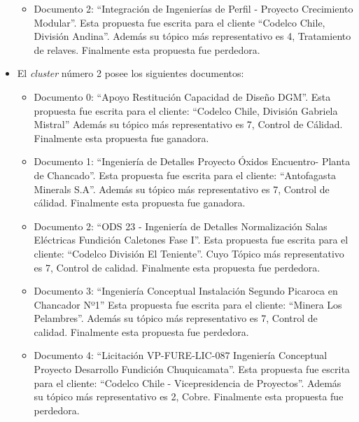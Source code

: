 \begin{itemize}
\begin{itemize}
            \item Documento 2: ``Integración de Ingenierías de Perfil - Proyecto Crecimiento Modular''.
            Esta propuesta fue escrita para el cliente ``Codelco Chile, División Andina''. Además su tópico más representativo es 4, Tratamiento de relaves. Finalmente esta propuesta fue perdedora.
        \end{itemize}
    \item El \textit{cluster} número 2 posee los siguientes documentos:
        \begin{itemize}
            \item Documento 0: ``Apoyo Restitución Capacidad de Diseño DGM''.
            Esta propuesta fue escrita para el cliente: ``Codelco Chile, División Gabriela Mistral'' 
            Además su tópico más representativo es 7, Control de Cálidad. Finalmente esta propuesta fue ganadora.

            \item Documento 1: ``Ingeniería de Detalles Proyecto Óxidos Encuentro- Planta de Chancado''. Esta propuesta fue escrita para el cliente: ``Antofagasta Minerals S.A''. 
            Además su tópico más representativo es 7, Control de cálidad. Finalmente esta propuesta fue ganadora.
            
            \item Documento 2: ``ODS 23 -  Ingeniería de Detalles Normalización Salas Eléctricas Fundición Caletones Fase I''. Esta propuesta fue escrita para el cliente: ``Codelco División El Teniente''.
            Cuyo Tópico más representativo es 7, Control de calidad. Finalmente esta propuesta fue perdedora.

            \item Documento 3: ``Ingeniería Conceptual Instalación Segundo Picaroca en Chancador Nº1''
            Esta propuesta fue escrita para el cliente: ``Minera Los Pelambres''. 
            Además su tópico más representativo es 7, Control de calidad.
            Finalmente esta propuesta fue perdedora.

            \item Documento 4: ``Licitación VP-FURE-LIC-087 Ingeniería Conceptual Proyecto Desarrollo Fundición Chuquicamata''.
            Esta propuesta fue escrita para el cliente: ``Codelco Chile - Vicepresidencia de Proyectos''. 
            Además su tópico más representativo es 2, Cobre.
            Finalmente esta propuesta fue perdedora.


\end{itemize}
\end{itemize}
